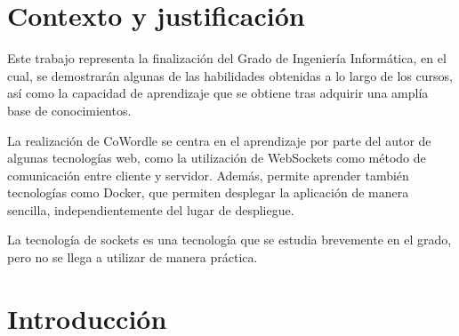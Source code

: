 \section{Contexto y justificación}
Este trabajo representa la finalización del Grado de Ingeniería Informática, en el cual, se demostrarán algunas de las habilidades obtenidas a lo largo de los cursos, así como la capacidad de aprendizaje que se obtiene tras adquirir una amplía base de conocimientos.

La realización de CoWordle se centra en el aprendizaje por parte del autor de algunas tecnologías web, como la utilización de WebSockets como método de comunicación entre cliente y servidor.  Además, permite aprender también tecnologías como Docker, que permiten desplegar la aplicación de manera sencilla, independientemente del lugar de despliegue.

La tecnología de sockets es una tecnología que se estudia brevemente en el grado, pero no se llega a utilizar de manera práctica.

\section{Introducción}
